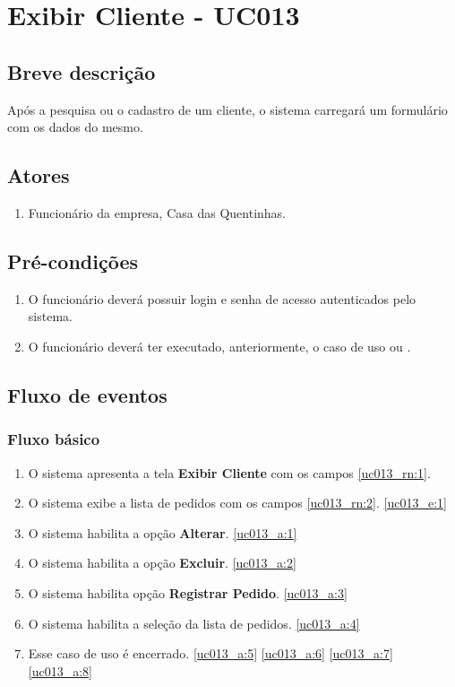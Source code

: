 \chapter{Exibir Cliente - UC013} \label{uc013}

\section{Breve descrição}

Após a pesquisa ou o cadastro de um cliente, o sistema carregará um formulário com os dados do mesmo.

\section{Atores}

\begin{enumerate}
	\item Funcionário da empresa, Casa das Quentinhas.
\end{enumerate}

\section{Pré-condições}

\begin{enumerate}
	\item O funcionário deverá possuir login e senha de acesso autenticados pelo sistema.
	\item O funcionário deverá ter executado, anteriormente, o caso de uso  ou .
\end{enumerate}

\section{Fluxo de eventos}

\subsection{Fluxo básico}

\begin{enumerate}[label=P\arabic*]
	\item O sistema apresenta a tela \textbf{Exibir Cliente} com os campos \ref{uc013_rn:1}. \label{uc013_p:1}
	\item O sistema exibe a lista de pedidos com os campos \ref{uc013_rn:2}. \label{uc013_p:2}\ref{uc013_e:1}
	\item O sistema habilita a opção \textbf{Alterar}. \label{uc013_p:3}\ref{uc013_a:1} 
	\item O sistema habilita a opção \textbf{Excluir}. \label{uc013_p:4}\ref{uc013_a:2}
	\item O sistema habilita opção \textbf{Registrar Pedido}. \label{uc013_p:5}\ref{uc013_a:3}
	\item O sistema habilita a seleção da lista de pedidos. \label{uc013_p:6}\ref{uc013_a:4}
	\item Esse caso de uso é encerrado. \label{uc013_p:7}\ref{uc013_a:5} \ref{uc013_a:6} \ref{uc013_a:7}  \ref{uc013_a:8}
\end{enumerate}

